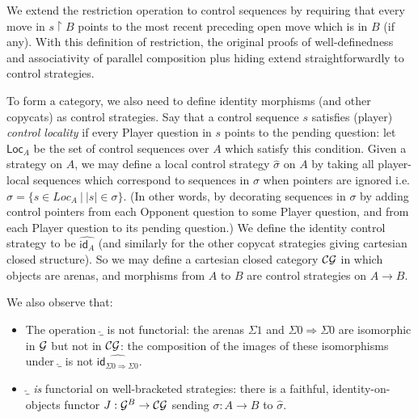 \documentclass{eptcs}
\def\G{{\cal{G}}}
\def\0{0}
\def\1m{\iota}
\def\restrict{\!\! \upharpoonright \!\!}
\def\1{1}
\def\restrict{\!\! \upharpoonright \!\!}
\newcommand{\Loc}{\mathsf{Loc}}
\newcommand{\CG}{{\cal{CG}}}
\newcommand{\id}{{\mathsf{id}}}
\begin{document}
{We extend the restriction operation to control sequences by requiring that every move in  $s\restrict B$ points to the most recent preceding open move which is in $B$ (if any). 
With this definition of restriction, the original proofs of  well-definedness and associativity of parallel composition plus hiding  \cite{McCT} extend straightforwardly to control strategies.
 




To form a category, we also need to define identity morphisms (and other copycats) as control strategies.  Say that a control sequence  $s$ satisfies  (player) \emph{control locality} if every Player question in $s$ points to the pending question: let $\Loc_A$ be the set of control sequences over $A$ which satisfy this condition. Given a  strategy on $A$, we may define a local control strategy $\widehat{\sigma}$  on $A$ by taking all player-local sequences which correspond to sequences in $\sigma$ when pointers are ignored  i.e. $\widehat{\sigma} =  \{s \in Loc_{A}\ |\ |s| \in \sigma\}$. (In other words, by decorating sequences in $\sigma$ by adding control pointers from each Opponent question to some Player question, and from each Player question to its pending  question.)
 We define the identity control strategy to be $\widehat{\id_A}$ (and similarly for the other copycat strategies giving cartesian closed structure).   So  we may define a cartesian closed category $\CG$ in which objects are arenas, and morphisms from $A$ to $B$ are  control strategies on $A \rightarrow B$. 

We also observe that:
\begin{itemize}
\item The operation $\widehat{\_}$ is not functorial: the  arenas $\Sigma\1$ and $\Sigma\0 \Rightarrow \Sigma\0$ are isomorphic in $\G$ but not in $\CG$: the  composition of the images of these isomorphisms under $\widehat{\_}$ is not $\widehat{\id_{\Sigma\0 \Rightarrow \Sigma\0}}$.
 \item $\widehat{\_}$ \emph{is} functorial on well-bracketed strategies:  there is a faithful, identity-on-objects functor $J:\G^B \rightarrow \CG$ sending $\sigma:A \rightarrow B$ to $\widehat{\sigma}$.
\end{itemize}

}
\end{document}
